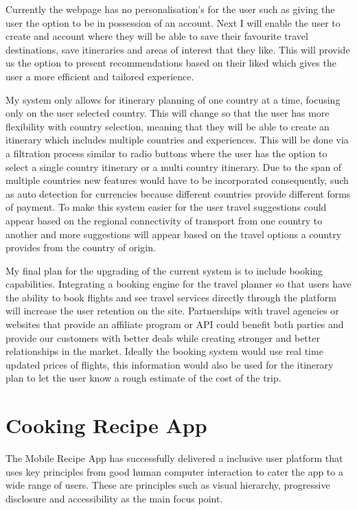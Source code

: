 \documentclass[]{project_final}
\begin{document}
Currently the webpage has no personalisation's for the user such as giving the user the option to be in possession of an account. Next I will enable the user to create and account where they will be able to save their favourite travel destinations, save itineraries and areas of interest that they like. This will provide us the option to present recommendations based on their liked which gives the user a more efficient and tailored experience.

My system only allows for itinerary planning of one country at a time, focusing only on the user selected country. This will change so that the user has more flexibility with country selection, meaning that they will be able to create an itinerary which includes multiple countries and experiences. This will be done via a filtration process similar to radio buttons where the user has the option to select a single country itinerary or a multi country itinerary. Due to the span of multiple countries new features would have to be incorporated consequently, such as auto detection for currencies because different countries provide different forms of payment.
To make this system easier for the user travel suggestions could appear based on the regional connectivity of transport from one country to another and more suggestions will appear based on the travel options a country provides from the country of origin.

My final plan for the upgrading of the current system is to include booking capabilities. Integrating a booking engine for the travel planner so that users have the ability to book flights and see travel services directly through the platform will increase the user retention on the site.
Partnerships with travel agencies or websites that provide an affiliate program or API could benefit both parties and provide our customers with better deals while creating stronger and better relationships in the market.
Ideally the booking system would use real time updated prices of flights, this information would also be used for the itinerary plan to let the user know a rough estimate of the cost of the trip.

\section{Cooking Recipe App}
The Mobile Recipe App has successfully delivered a inclusive user platform that uses key principles from good human computer interaction to cater the app to a wide range of users. These are principles such as visual hierarchy, progressive disclosure and accessibility as the main focus point.
\end{document}
